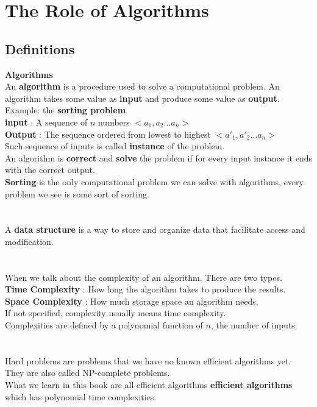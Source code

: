 \chapter{The Role of Algorithms}
\section{Definitions}
\vspace*{0.2cm}\large\textbf{Algorithms}\\
An \textbf{algorithm} is a procedure used to solve a computational problem.
An algorithm takes some value as \textbf{input} and produce some value as \textbf{output}.
\\
Example: the \textbf{sorting problem}\\
\indent \textbf{input} : A sequence of $n$ numbers $<a_1,a_2\dots a_n>$\\
\indent \textbf{Output} : The sequence ordered from lowest to highest $<a'_{1},a'_{2}\dots a_n>$
\\
\indent Such sequence of inputs is called \textbf{instance} of the problem.\\
An algorithm is \textbf{correct} and \textbf{solve} the problem if for every input instance it ends with the correct output.\\
\indent \textbf{Sorting} is the only computational problem we can solve with algorithms, every problem we see is some sort of sorting.\\ 
\\
\\ 
A \textbf{data structure} is a way to store and organize data that facilitate access and modification. 
\\\\
\\
When we talk about the complexity of an algorithm. There are two types.\\
\indent \textbf{Time Complexity} : How long the algorithm takes to produce the results. \\
\indent\textbf{Space Complexity} : How much storage space an algorithm needs.\\
\indent If not specified, complexity usually means time complexity.\\
Complexities are defined by a polynomial function of $n$, the number of inputs.
\\\\
\\ 
Hard problems are problems that we have no known efficient algorithms yet. They are also called NP-complete problems.\\
\indent What we learn in this book are all efficient algorithms \textbf{efficient algorithms} which has polynomial time complexities. 

